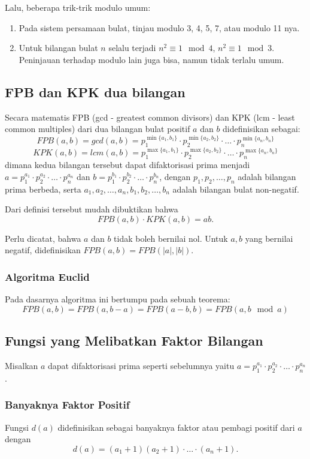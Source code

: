 Lalu, beberapa trik-trik modulo umum:
\begin{enumerate}
    \item Pada sistem persamaan bulat, tinjau modulo 3, 4, 5, 7, atau modulo 11 nya.
    \item Untuk bilangan bulat $n$ selalu terjadi $n^2 \equiv 1 \mod 4$, $n^2 \equiv 1 \mod 3$. Peninjauan terhadap modulo lain juga bisa, namun tidak terlalu umum.
\end{enumerate}

\subsection{FPB dan KPK dua bilangan}
Secara matematis FPB (gcd - greatest common divisors) dan KPK (lcm - least common multiples) dari dua bilangan bulat positif $a$ dan $b$ 
didefinisikan sebagai:
$$FPB(a,b) = gcd(a,b) = p_1^{\min\{a_1,b_1\}}\cdot p_2^{\min\{a_2,b_2\}} \cdot \ldots \cdot p_n^{\min\{a_n,b_n\}}$$
$$KPK(a,b) = lcm(a,b) =p_1^{\max\{a_1,b_1\}}\cdot p_2^{\max\{a_2,b_2\}} \cdot \ldots \cdot p_n^{\max\{a_n,b_n\}}$$
dimana kedua bilangan tersebut dapat difaktorisasi prima menjadi
$a=p_1^{a_1}\cdot p_2^{a_2}\cdot \ldots \cdot p_n^{a_n}$ dan $b=p_1^{b_1}\cdot p_2^{b_2} \cdot \ldots \cdot p_n^{b_n}$, dengan $p_1,p_2,\dots,p_n$ adalah bilangan prima berbeda, serta $a_1,a_2,\dots,a_n,b_1,b_2,\dots,b_n$ adalah bilangan bulat non-negatif.

Dari definisi tersebut mudah dibuktikan bahwa
$$FPB(a,b) \cdot KPK(a,b) = ab.$$

Perlu dicatat, bahwa $a$ dan $b$ tidak boleh bernilai nol. Untuk $a,b$ yang bernilai negatif, didefinisikan $FPB(a,b) = FPB(|a|,|b|)$.

\subsubsection{Algoritma Euclid}
Pada dasarnya algoritma ini bertumpu pada sebuah teorema:
$$FPB(a,b) = FPB(a,b-a) = FPB(a-b,b)=FPB(a, b \mod a)$$

\subsection{Fungsi yang Melibatkan Faktor Bilangan}
Misalkan $a$ dapat difaktorisasi prima seperti sebelumnya yaitu $a=p_1^{a_1}\cdot p_2^{a_2}\cdot \ldots \cdot p_n^{a_n}$.
\subsubsection{Banyaknya Faktor Positif}
Fungsi $d(a)$ didefinisikan sebagai banyaknya faktor atau pembagi positif dari $a$ dengan
$$d(a) = (a_1+1)(a_2+1)\cdot \ldots \cdot (a_n+1).$$

